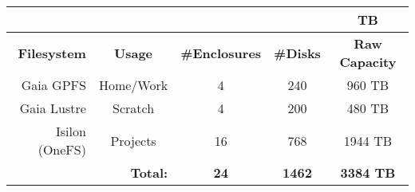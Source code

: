 % 
% 
% 


\begin{table}[h]
  \centering\scriptsize
  \begin{tabular}{|r||c|c|c|c|}
    \multicolumn{4}{c}{}  & \multicolumn{1}{c}{TB}\\\hline
    \rowcolor{lightgray}
    \textbf{Filesystem}     & \textbf{Usage}  & \textbf{\#Enclosures} & \textbf{\#Disks} & \textbf{Raw Capacity} \\ \hline \hline
    Gaia GPFS               & Home/Work       & 4                     & 240              & 960 TB                  \\
    Gaia Lustre             & Scratch         & 4                     & 200              & 480 TB                  \\
    Isilon (OneFS)     & Projects        & 16                    & 768              & 1944 TB                 \\ \hline
    \multicolumn{2}{r}{\textbf{Total:}} & \multicolumn{1}{c}{\textbf{24}} & \multicolumn{1}{c}{\textbf{1462}} & \multicolumn{1}{c}{\textbf{3384 TB}}       \\ 
  \end{tabular}
\end{table}



% 
